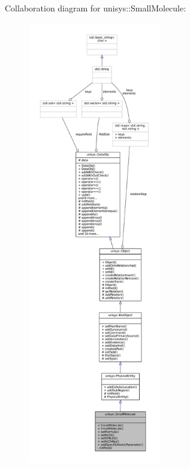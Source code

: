 Collaboration diagram for unisys\-:\-:Small\-Molecule\-:
\nopagebreak
\begin{figure}[H]
\begin{center}
\leavevmode
\includegraphics[height=550pt]{classunisys_1_1SmallMolecule__coll__graph}
\end{center}
\end{figure}
